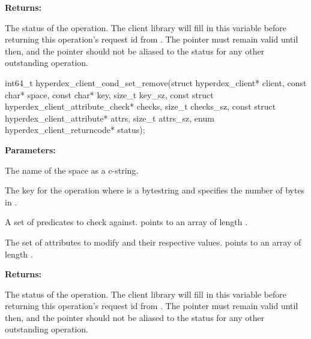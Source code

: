 \noindent\textbf{Returns:}
\begin{description}[labelindent=\widthof{{\code{status}}},leftmargin=*,noitemsep,nolistsep,align=right]
\item[\code{status}] The status of the operation.  The client library will fill in this variable before returning this operation's request id from .  The pointer must remain valid until then, and the pointer should not be aliased to the status for any other outstanding operation.
\end{description}

\funcsep
{}
\begin{ccode}
int64_t hyperdex_client_cond_set_remove(struct hyperdex_client* client,
                const char* space,
                const char* key, size_t key_sz,
                const struct hyperdex_client_attribute_check* checks, size_t checks_sz,
                const struct hyperdex_client_attribute* attrs, size_t attrs_sz,
                enum hyperdex_client_returncode* status);
\end{ccode}
\funcdesc 

\noindent\textbf{Parameters:}
\begin{description}[labelindent=\widthof{{\code{checks}, \code{checks\_sz}}},leftmargin=*,noitemsep,nolistsep,align=right]
\item[\code{space}] The name of the space as a c-string.
\item[\code{key}, \code{key\_sz}] The key for the operation where  is a bytestring and  specifies the number of bytes in .
\item[\code{checks}, \code{checks\_sz}] A set of predicates to check against.   points to an array of length .
\item[\code{attrs}, \code{attrs\_sz}] The set of attributes to modify and their respective values.   points to an array of length .
\end{description}

\noindent\textbf{Returns:}
\begin{description}[labelindent=\widthof{{\code{status}}},leftmargin=*,noitemsep,nolistsep,align=right]
\item[\code{status}] The status of the operation.  The client library will fill in this variable before returning this operation's request id from .  The pointer must remain valid until then, and the pointer should not be aliased to the status for any other outstanding operation.
\end{description}

